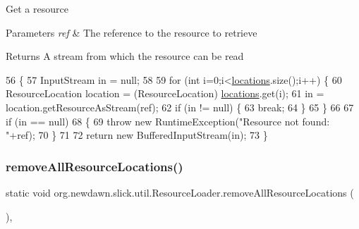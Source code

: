 Get a resource


\begin{DoxyParams}{Parameters}
{\em ref} & The reference to the resource to retrieve \\
\hline
\end{DoxyParams}
\begin{DoxyReturn}{Returns}
A stream from which the resource can be read 
\end{DoxyReturn}

\begin{DoxyCode}
56                                                               \{
57         InputStream in = null;
58         
59         \textcolor{keywordflow}{for} (\textcolor{keywordtype}{int} i=0;i<\mbox{\hyperlink{classorg_1_1newdawn_1_1slick_1_1util_1_1_resource_loader_a28036dde216244ec1fb50577d136eac3}{locations}}.size();i++) \{
60             ResourceLocation location = (ResourceLocation) \mbox{\hyperlink{classorg_1_1newdawn_1_1slick_1_1util_1_1_resource_loader_a28036dde216244ec1fb50577d136eac3}{locations}}.get(i);
61             in = location.getResourceAsStream(ref);
62             \textcolor{keywordflow}{if} (in != null) \{
63                 \textcolor{keywordflow}{break};
64             \}
65         \}
66         
67         \textcolor{keywordflow}{if} (in == null)
68         \{
69             \textcolor{keywordflow}{throw} \textcolor{keyword}{new} RuntimeException(\textcolor{stringliteral}{"Resource not found: "}+ref);
70         \}
71             
72         \textcolor{keywordflow}{return} \textcolor{keyword}{new} BufferedInputStream(in);
73     \}
\end{DoxyCode}
\mbox{\label{classorg_1_1newdawn_1_1slick_1_1util_1_1_resource_loader_a36594e1392cd15e9c73702a2f8dd9b95}} 
\subsubsection{\texorpdfstring{remove\+All\+Resource\+Locations()}{removeAllResourceLocations()}}
{\footnotesize\ttfamily static void org.\+newdawn.\+slick.\+util.\+Resource\+Loader.\+remove\+All\+Resource\+Locations (\begin{DoxyParamCaption}{ }\end{DoxyParamCaption})\hspace{0.3cm}{\ttfamily [inline]}, {\ttfamily [static]}}

